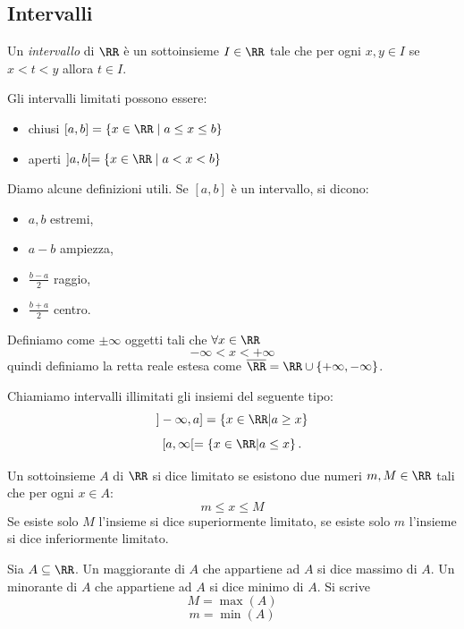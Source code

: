 \documentclass[11pt]{scrartcl}
\begin{document}
	\subsection{Intervalli}
	
	\begin{definition}
		Un \textit{intervallo} di $\RR$ è un sottoinsieme $I\in\RR$ tale che per ogni $x,y\in I$ se $x<t<y$ allora $t\in I$.
	\end{definition}
	Gli intervalli limitati possono essere:
	\begin{itemize}
		\item chiusi $[a,b]=\{x\in\RR\mid a\le x\le b\}$ 
		\item aperti $]a,b[=\{x\in\RR\mid a<x<b\}$
	\end{itemize}
	
	\begin{definition} Diamo alcune definizioni utili. Se $[a,b]$ è un intervallo, si dicono:
		\begin{itemize}
			\item $a,b$ estremi,
			\item $a-b$ ampiezza,
			\item $\frac{b-a}{2}$ raggio,
			\item $\frac{b+a}{2}$ centro.
		\end{itemize}
	\end{definition}
	\begin{definition}
		Definiamo come $\pm\infty$ oggetti tali che $\forall x\in\RR$
		$$-\infty<x<+\infty$$
		quindi definiamo la retta reale estesa come $\overline{\RR}=\RR \cup \{+\infty,-\infty\}$.
	\end{definition}
	
	\begin{definition}
		Chiamiamo intervalli illimitati gli insiemi del seguente tipo:
		$$]-\infty,a]=\left\{x\in\RR|a\ge x\right\}$$
		$$[a,\infty[ =\left\{x\in\RR|a\le x\right\}.$$
	\end{definition}
	
	\begin{definition}
		Un sottoinsieme $A$ di $\RR$ si dice limitato se esistono due numeri $m,M\in\RR$ tali che per ogni $x\in A$:
		$$m\le x \le M$$ 
		Se esiste solo $M$ l'insieme si dice superiormente limitato, se esiste solo $m$ l'insieme si dice inferiormente limitato.
	\end{definition}
	
	\begin{definition}
		Sia $A\subseteq\RR$. Un maggiorante di $A$ che appartiene ad $A$ si dice massimo di $A$. Un minorante di $A$ che appartiene ad $A$ si dice minimo di $A$. Si scrive
		$$M=\max(A)$$
		$$m=\min(A)$$
	\end{definition}
	
\end{document}
